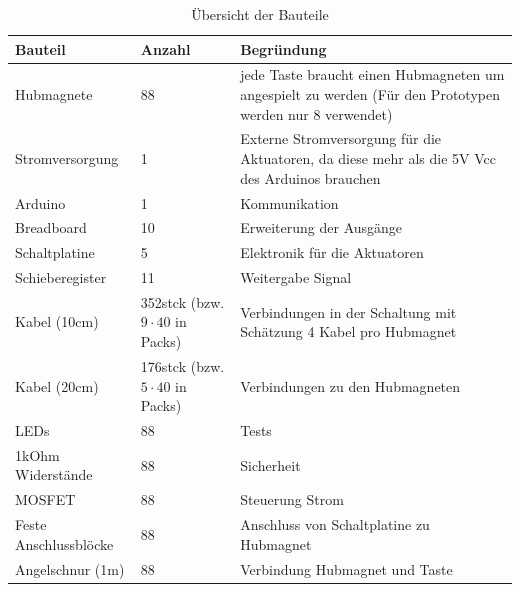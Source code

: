 \begin{table}[htbp]
    \centering
    \begin{tabular}{|m{3.8cm}|m{1.7cm}|m{8cm}|}
        \hline
        \textbf{Bauteil} &  \textbf{Anzahl} & \textbf{Begründung}  \\
        \hline
        Hubmagnete & 88 & jede Taste braucht einen Hubmagneten um angespielt zu werden (Für den Prototypen werden nur 8 verwendet) \\
        \hline
        Stromversorgung & 1 & Externe Stromversorgung für die Aktuatoren, da diese mehr als die 5V Vcc des Arduinos brauchen \\
        \hline
        Arduino & 1 & Kommunikation \\
        \hline
        Breadboard & 10 & Erweiterung der Ausgänge \\
        \hline
        Schaltplatine & 5 & Elektronik für die Aktuatoren\\
        \hline
        Schieberegister & 11 & Weitergabe Signal\\
        \hline
        Kabel (10cm) & 352stck (bzw. $9\cdot40$ in Packs) & Verbindungen in der Schaltung mit Schätzung 4 Kabel pro Hubmagnet\\
        \hline
        Kabel (20cm) & 176stck (bzw.$5\cdot40$ in Packs) & Verbindungen zu den Hubmagneten \\
        \hline
        LEDs & 88 & Tests \\
        \hline
        1kOhm Widerstände & 88 & Sicherheit \\
        \hline
        MOSFET & 88 & Steuerung Strom \\
        \hline
        Feste Anschlussblöcke & 88 & Anschluss von Schaltplatine zu Hubmagnet\\
        \hline
        Angelschnur (1m) & 88 & Verbindung Hubmagnet und Taste \\
        \hline
    \end{tabular}
    \caption{Übersicht der Bauteile}
    \label{table:Bauteile}
\end{table}

